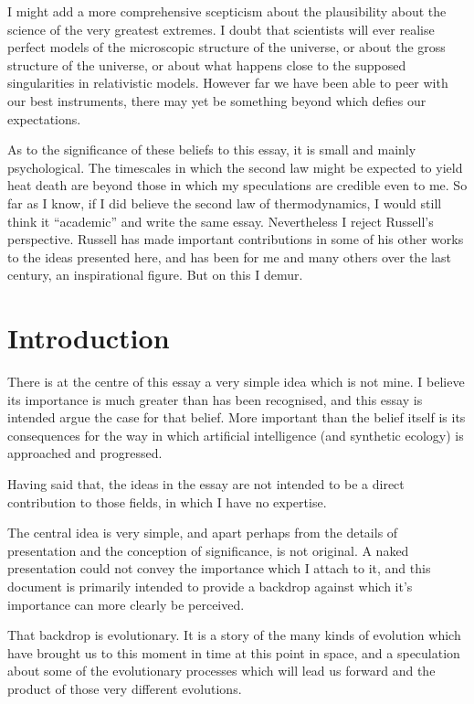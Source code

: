 \documentclass[10pt,titlepage]{book}
\begin{document}
I might add a more comprehensive scepticism about the plausibility about the science of the very greatest extremes.
I doubt that scientists will ever realise perfect models of the microscopic structure of the universe, or about the gross structure of the universe, or about what happens close to the supposed singularities in relativistic models.
However far we have been able to peer with our best instruments, there may yet be something beyond which defies our expectations.

As to the significance of these beliefs to this essay, it is small and mainly psychological.
The timescales in which the second law might be expected to yield heat death are beyond those in which my speculations are credible even to me.
So far as I know, if I did believe the second law of thermodynamics, I would still think it ``academic'' and write the same essay.
Nevertheless I reject Russell's perspective.
Russell has made important contributions in some of his other works to the ideas presented here, and has been for me and many others over the last century, an inspirational figure.
But on this I demur.

\section{Introduction}

There is at the centre of this essay a very simple idea which is not mine.
I believe its importance is much greater than has been recognised, and this essay is intended argue the case for that belief.
More important than the belief itself is its consequences for the way in which artificial intelligence (and synthetic ecology) is approached and progressed.

Having said that, the ideas in the essay are not intended to be a direct contribution to those fields, in which I have no expertise.

The central idea is very simple, and apart perhaps from the details of presentation and the conception of significance, is not original.
A naked presentation could not convey the importance which I attach to it, and this document is primarily intended to provide a backdrop against which it's importance can more clearly be perceived.

That backdrop is evolutionary.
It is a story of the many kinds of evolution which have brought us to this moment in time at this point in space, and a speculation about some of the evolutionary processes which will lead us forward and the product of those very different evolutions.
\end{document}
